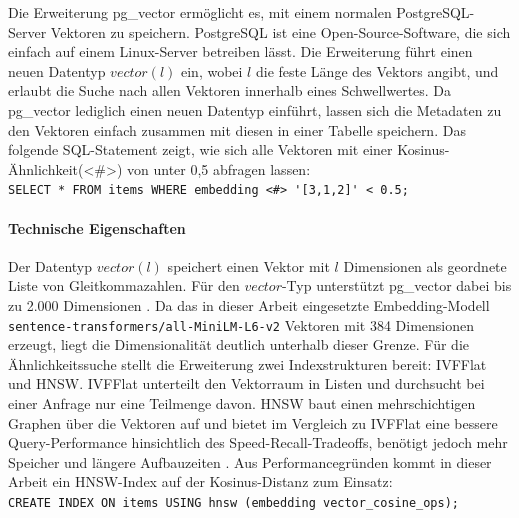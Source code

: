 Die Erweiterung pg\_vector \cite{githubGitHubPgvectorpgvector} ermöglicht es, mit 
einem normalen PostgreSQL-Server Vektoren zu speichern. PostgreSQL ist eine 
Open-Source-Software, die sich einfach auf einem Linux-Server betreiben lässt. Die 
Erweiterung führt einen neuen Datentyp $vector(l)$ ein, wobei $l$ die feste Länge 
des Vektors angibt, und erlaubt die Suche nach allen Vektoren innerhalb eines 
Schwellwertes. Da pg\_vector lediglich einen neuen Datentyp einführt, lassen sich 
die Metadaten zu den Vektoren einfach zusammen mit diesen in einer Tabelle 
speichern. Das folgende \ac{SQL}-Statement zeigt, wie sich alle Vektoren mit einer
Kosinus-Ähnlichkeit(<\#>) von unter 0,5 abfragen lassen:\\
\lstinline{SELECT * FROM items WHERE embedding <#> '[3,1,2]' < 0.5;}

\paragraph{Technische Eigenschaften}
Der Datentyp $vector(l)$ speichert einen Vektor mit $l$ Dimensionen als geordnete 
Liste von Gleitkommazahlen. Für den $vector$-Typ unterstützt pg\_vector dabei bis 
zu 2.000 Dimensionen \cite{githubGitHubPgvectorpgvector}. Da das in dieser Arbeit 
eingesetzte Embedding-Modell \texttt{sentence-transformers/all-MiniLM-L6-v2} 
Vektoren mit 384 Dimensionen erzeugt, liegt die Dimensionalität deutlich unterhalb 
dieser Grenze. Für die Ähnlichkeitssuche stellt die Erweiterung zwei 
Indexstrukturen bereit: \ac{IVFFlat} \cite{pgvectorIVFFlat} und \acs{HNSW}\cite{pgvectorhnsw}. \acs{IVFFlat} unterteilt den Vektorraum in
Listen und durchsucht bei einer Anfrage nur eine Teilmenge davon. \acs{HNSW}
baut einen mehrschichtigen Graphen über die 
Vektoren auf und bietet im Vergleich zu IVFFlat eine bessere Query-Performance 
hinsichtlich des Speed-Recall-Tradeoffs, benötigt jedoch mehr Speicher und längere 
Aufbauzeiten \cite{githubGitHubPgvectorpgvector}. Aus Performancegründen kommt in 
dieser Arbeit ein HNSW-Index auf der Kosinus-Distanz zum Einsatz:\\
\lstinline{CREATE INDEX ON items USING hnsw (embedding vector_cosine_ops);}

